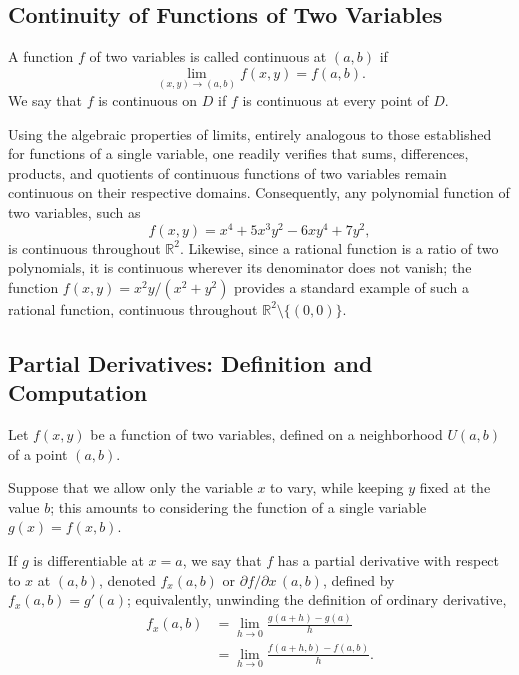 

\subsection{Continuity of Functions of Two Variables}

\begin{definition}
A function $f$ of two variables is called continuous at $(a,b)$ if
\[
\lim_{(x,y) \to (a,b)} f(x,y) = f(a,b).
\]
We say that $f$ is continuous on $D$ if $f$ is continuous at every point of $D$.
\end{definition}

Using the algebraic properties of limits, entirely analogous to those established for functions of a single variable, one readily verifies that sums, differences, products, and quotients of continuous functions of two variables remain continuous on their respective domains. Consequently, any polynomial function of two variables, such as
\[
f(x,y) = x^4 + 5x^3y^2 - 6xy^4 + 7y^2,
\] is continuous throughout $\mathbb{R}^2$. Likewise, since a rational function is a ratio of two polynomials, it is continuous wherever its denominator does not vanish; the function $f(x,y) = x^2y/(x^2+y^2)$ provides a standard example of such a rational function, continuous throughout $\mathbb{R}^2 \setminus \{(0,0)\}$.

\subsection{Partial Derivatives: Definition and Computation}


Let $f(x,y)$ be a function of two variables, defined on a neighborhood $U(a,b)$ of a point $(a,b)$.

Suppose that we allow only the variable $x$ to vary, while keeping $y$ fixed at the value $b$; this amounts to considering the function of a single variable $g(x) = f(x,b)$.

If $g$ is differentiable at $x=a$, we say that $f$ has a partial derivative with respect to $x$ at $(a,b)$, denoted $f_x(a,b)$ or $\partial f/\partial x \, (a,b)$, defined by $f_x(a,b) = g'(a)$; equivalently, unwinding the definition of ordinary derivative,
\[
\begin{aligned}
f_x(a,b) &= \lim_{h \to 0} \frac{g(a+h) - g(a)}{h} \\[0.5em]
&= \lim_{h \to 0} \frac{f(a+h,b) - f(a,b)}{h}.
\end{aligned}
\]

